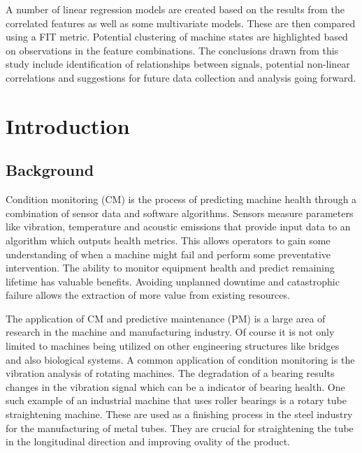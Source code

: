 \documentclass[]{article}
\begin{document}
A number of linear regression models are created based on the results from the correlated features as well as some multivariate models. These are then compared using a FIT metric. Potential clustering of machine states are highlighted based on observations in the feature combinations. The conclusions drawn from this study include identification of relationships between signals, potential non-linear correlations and suggestions for future data collection and analysis going forward.
\clearpage

\setcounter{tocdepth}{3}
\tableofcontents
\newpage

\listoffigures
\listoftables
\newpage

\printnoidxglossary[type=\acronymtype, style=list, nogroupskip=true]
\newpage


\section{Introduction}
\subsection{Background}
Condition monitoring (\gls{CM}) is the process of predicting machine health through a combination of sensor data and software algorithms. Sensors measure parameters like vibration, temperature and acoustic emissions that provide input data to an algorithm which outputs health metrics. This allows operators to gain some understanding of when a machine might fail and perform some preventative intervention. The ability to monitor equipment health and predict remaining lifetime has valuable benefits. Avoiding unplanned downtime and catastrophic failure allows the extraction of more value from existing resources.

The application of CM and predictive maintenance (\gls{PM}) is a large area of research in the machine and manufacturing industry. Of course it is not only limited to machines being utilized on other engineering structures like bridges and also biological systems. 
A common application of condition monitoring is the vibration analysis of rotating machines. The degradation of a bearing results changes in the vibration signal which can be a indicator of bearing health. 
One such example of an industrial machine that uses roller bearings is a rotary tube straightening machine. These are used as a finishing process in the steel industry for the manufacturing of metal tubes. They are crucial for straightening the tube in the longitudinal direction and improving ovality of the product. 
\end{document}
